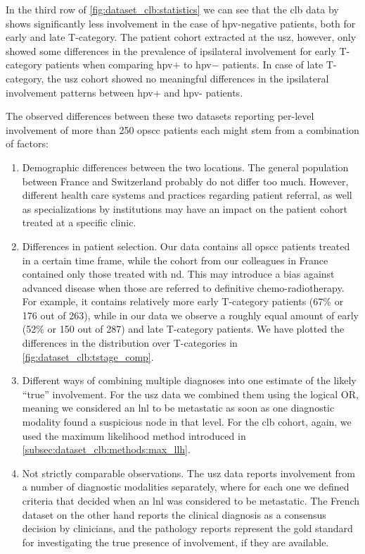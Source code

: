 \documentclass[\relativeRoot/main.tex]{subfiles}
\begin{document}
In the third row of \cref{fig:dataset_clb:statistics} we can see that the \gls{clb} data by  shows significantly less involvement in the case of \gls{hpv}-negative patients, both for early and late T-category. The patient cohort extracted at the \gls{usz}, however, only showed some differences in the prevalence of ipsilateral involvement for early T-category patients when comparing \gls{hpv}$+$ to \gls{hpv}$-$ patients. In case of late T-category, the \gls{usz} cohort showed no meaningful differences in the ipsilateral involvement patterns between \gls{hpv}+ and \gls{hpv}- patients.

The observed differences between these two datasets reporting per-level involvement of more than 250 \gls{opscc} patients each might stem from a combination of factors:

\begin{enumerate}
    \item Demographic differences between the two locations. The general population between France and Switzerland probably do not differ too much. However, different health care systems and practices regarding patient referral, as well as specializations by institutions may have an impact on the patient cohort treated at a specific clinic.
    \item Differences in patient selection. Our data contains all \gls{opscc} patients treated in a certain time frame, while the cohort from our colleagues in France contained only those treated with \acrlong{nd}. This may introduce a bias against advanced disease when those are referred to definitive chemo-radiotherapy. For example, it contains relatively more early T-category patients (67\% or 176 out of 263), while in our data we observe a roughly equal amount of early (52\% or 150 out of 287) and late T-category patients. We have plotted the differences in the distribution over T-categories in \cref{fig:dataset_clb:tstage_comp}.
    \item Different ways of combining multiple diagnoses into one estimate of the likely ``true'' involvement. For the \gls{usz} data we combined them using the logical OR, meaning we considered an \gls{lnl} to be metastatic as soon as one diagnostic modality found a suspicious node in that level. For the \gls{clb} cohort, again, we used the maximum likelihood method introduced in \cref{subsec:dataset_clb:methods:max_llh}.
    \item Not strictly comparable observations. The \gls{usz} data reports involvement from a number of diagnostic modalities separately, where for each one we defined criteria that decided when an \gls{lnl} was considered to be metastatic. The French dataset on the other hand reports the clinical diagnosis as a consensus decision by clinicians, and the pathology reports represent the gold standard for investigating the true presence of involvement, if they are available.
\end{enumerate}
\end{document}
